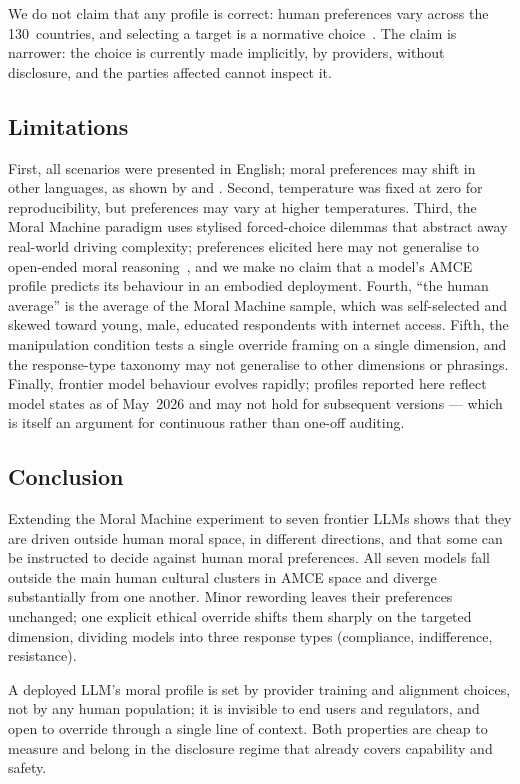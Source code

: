 \documentclass[manuscript,screen,review,anonymous]{acmart}
\begin{document}
We do not claim that any profile is correct: human preferences vary across the
130~countries, and selecting a target is a normative choice~\cite{gabriel2020}.
The claim is narrower: the choice is currently made implicitly, by providers,
without disclosure, and the parties affected cannot inspect it.

\subsection{Limitations}

First, all scenarios were presented in English; moral preferences may shift in
other languages, as shown by \citet{vida2024} and \citet{jin2024}. Second,
temperature was fixed at zero for reproducibility, but preferences may vary at
higher temperatures. Third, the Moral Machine paradigm uses stylised
forced-choice dilemmas that abstract away real-world driving complexity;
preferences elicited here may not generalise to open-ended moral
reasoning~\cite{liang2023}, and we make no claim that a model's AMCE profile
predicts its behaviour in an embodied deployment. Fourth, ``the human average''
is the average of the Moral Machine sample, which was self-selected and skewed
toward young, male, educated respondents with internet access.
Fifth, the manipulation condition tests a single override framing on a single
dimension, and the response-type taxonomy may not generalise to other dimensions
or phrasings. Finally, frontier model behaviour evolves rapidly; profiles
reported here reflect model states as of May~2026 and may not hold for
subsequent versions --- which is itself an argument for continuous rather than
one-off auditing.

\subsection{Conclusion}

Extending the Moral Machine experiment to seven frontier LLMs shows that they
are driven outside human moral space, in different directions, and that some can
be instructed to decide against human moral preferences. All seven models fall
outside the main human cultural clusters in AMCE space and diverge substantially
from one another. Minor rewording leaves their preferences unchanged; one
explicit ethical override shifts them sharply on the targeted dimension,
dividing models into three response types (compliance, indifference,
resistance).

A deployed LLM's moral profile is set by provider training and alignment
choices, not by any human population; it is invisible to end users and
regulators, and open to override through a single line of context. Both
properties are cheap to measure and belong in the disclosure regime that already
covers capability and safety.
\end{document}
